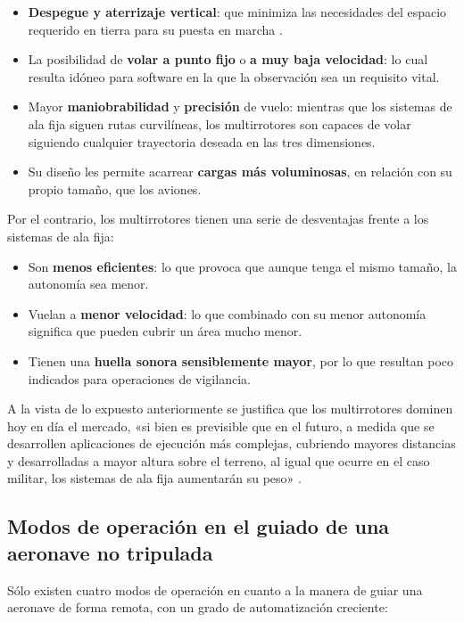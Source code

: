 \begin{itemize}
\item \textbf{Despegue y aterrizaje vertical}: que minimiza las necesidades del espacio requerido en tierra para su puesta en marcha	.
\item La posibilidad de \textbf{volar a punto fijo} o \textbf{a muy baja velocidad}: lo cual resulta idóneo para software en la que la observación sea un requisito vital.
\item Mayor \textbf{maniobrabilidad} y \textbf{precisión} de vuelo: mientras que los sistemas de ala fija siguen rutas curvilíneas, los multirrotores son capaces de volar siguiendo cualquier trayectoria deseada en las tres dimensiones.
\item Su diseño les permite acarrear \textbf{cargas más voluminosas}, en relación con su propio tamaño, que los aviones.
\end{itemize}

Por el contrario, los multirrotores tienen una serie de desventajas frente a los sistemas de ala fija:

\begin{itemize}
\item Son \textbf{menos eficientes}: lo que provoca que aunque tenga el mismo tamaño, la autonomía sea menor.
\item Vuelan a \textbf{menor velocidad}: lo que combinado con su menor autonomía significa que pueden cubrir un área mucho menor.
\item Tienen una \textbf{huella sonora sensiblemente mayor}, por lo que resultan poco indicados para operaciones de vigilancia.
\end{itemize}

A la vista de lo expuesto anteriormente se justifica que los multirrotores dominen hoy en día el mercado, 
«si bien es previsible que en el futuro, a medida que se desarrollen aplicaciones de ejecución más complejas, cubriendo 
mayores distancias y desarrolladas a mayor altura sobre el terreno, al igual que ocurre en el caso militar, los sistemas de ala 
fija aumentarán su peso» \cite{dron2}.

\subsection{Modos de operación en el guiado de una aeronave no tripulada}
\label{sec:mododeoperacion}

Sólo existen cuatro modos de operación en cuanto a la manera de guiar una aeronave de forma remota, 
con un grado de automatización creciente:


